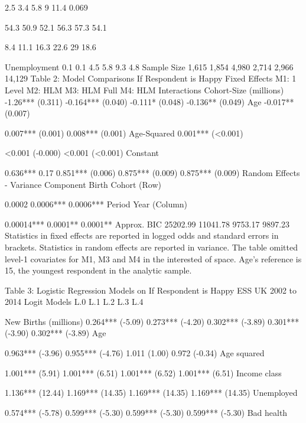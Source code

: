 2.5%
3.4%
5.8%
9%
11.4%
0.069







54.3%
50.9%
52.1%
56.3%
57.3%
54.1%







8.4%
11.1%
16.3%
22.6%
29%
18.6%







Unemployment
0.1%
0.1%
4.5%
5.8%
9.3%
4.8%
Sample Size
1,615
1,854
4,980
2,714
2,966
14,129
Table 2: Model Comparisons If Respondent is Happy
Fixed Effects
M1:
1 Level
M2:
HLM
M3:
HLM Full
M4: HLM Interactions
Cohort-Size (millions)
-1.26***
(0.311)
-0.164***
(0.040)
-0.111*
(0.048)
-0.136**
(0.049)
Age
-0.017**
(0.007)

0.007***
(0.001)
0.008***
(0.001)
Age-Squared
0.001***
(<0.001)

<0.001
(-0.000)
<0.001
(<0.001)
Constant

0.636***
0.17
0.851***
(0.006)
0.875***
(0.009)
0.875***
(0.009)
Random Effects - Variance Component
Birth Cohort (Row)

0.0002
0.0006***
0.0006***
Period Year (Column)

0.00014***
0.0001**
0.0001**
Approx. BIC
25202.99
11041.78
9753.17
9897.23
Statistics in fixed effects are reported in logged odds and standard errors in brackets. Statistics in random effects are reported in variance. The table omitted level-1 covariates for M1, M3 and M4 in the interested of space. Age’s reference is 15, the youngest respondent in the analytic sample.



Table 3: Logistic Regression Models on If Respondent is Happy ESS UK 2002 to 2014
Logit Models
L.0
L.1
L.2
L.3
L.4

New Births (millions)
0.264***
(-5.09)
0.273***
(-4.20)
0.302***
(-3.89)
0.301***
(-3.90)
0.302***
(-3.89)
Age


0.963***
(-3.96)
0.955***
(-4.76)
1.011
(1.00)
0.972
(-0.34)
Age squared


1.001*** (5.91)
1.001*** (6.51)
1.001*** (6.52)
1.001***
(6.51)
Income class


1.136*** (12.44)
1.169*** (14.35)
1.169*** (14.35)
1.169*** (14.35)
Unemployed


0.574***
(-5.78)
0.599***
(-5.30)
0.599***
(-5.30)
0.599***
(-5.30)
Bad health


